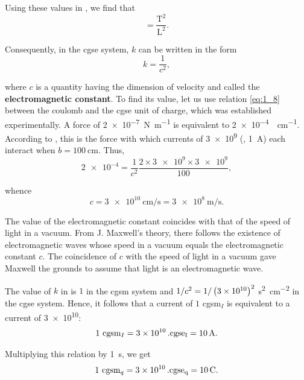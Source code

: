 \noindent
Using these values in , we find that
\begin{equation*}
    [k] = \frac{\text{T}^2}{\text{L}^2}.
\end{equation*}

\noindent
Consequently, in the cgse system, $k$ can be written in the form
\begin{equation}\label{eq:6_5}
    k = \frac{1}{c^2},
\end{equation}

\noindent
where $c$ is a quantity having the dimension of velocity and called the \textbf{electromagnetic constant}. To find its value, let us use relation \eqref{eq:1_8} between the coulomb and the cgse unit of charge, which was established experimentally. A force of \SI{2e-7}{\newton\per\metre} is equivalent to \SI{2e-4}{\dyne\per\centi\metre}. According to , this is the force with which currents of \num{3e9}  (\ie, \SI{1}{\ampere}) each interact when $b=\SI{100}{\centi\metre}$. Thus,
\begin{equation*}
    \num{2e-4} = \frac{1}{c^2} \frac{2\times \num{3e9} \times \num{3e9}}{100},
\end{equation*}

\noindent
whence
\begin{equation}\label{eq:6_6}
    c = \SI{3e10}{\centi\metre\per\second} = \SI{3e8}{\metre\per\second}.
\end{equation}

The value of the electromagnetic constant coincides with that of the speed of light in a vacuum. From J. Maxwell's theory, there follows the existence of electromagnetic waves whose speed in a vacuum equals the electromagnetic constant $c$. The coincidence of $c$ with the speed of light in a vacuum gave Maxwell the grounds to assume that light is an electromagnetic wave.

The value of $k$ in  is $1$ in the cgsm system and $1/c^2=1/\left(\num{3e10}\right)^2$ \si{\second\squared\per\centi\metre\squared} in the cgse system. Hence, it follows that a current of $1$ cgsm$_I$ is equivalent to a current of \num{3e10}:
\begin{equation}\label{eq:6_7}
    1 \text{~cgsm$_{I}$} = \SI{3e10}{\text{~cgse$_{I}$}} = \SI{10}{\ampere}.
\end{equation}

\noindent
Multiplying this relation by \SI{1}{\second}, we get
\begin{equation}\label{eq:6_8}
    1 \text{~cgsm$_{q}$} = \SI{3e10}{\text{~cgse$_{q}$}} = \SI{10}{\coulomb}.
\end{equation}

